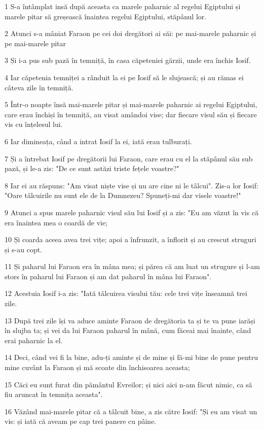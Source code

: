 \par 1 S-a întâmplat insă după aceasta ca marele paharnic al regelui Egiptului și marele pitar să greșească înaintea regelui Egiptului, stăpânul lor.
\par 2 Atunci s-a mâniat Faraon pe cei doi dregători ai săi: pe mai-marele paharnic și pe mai-marele pitar
\par 3 Și i-a pus sub pază în temniță, în casa căpeteniei gărzii, unde era închis Iosif.
\par 4 Iar căpetenia temniței a rânduit la ei pe Iosif să le slujească; și au rămas ei câteva zile în temniță.
\par 5 Într-o noapte însă mai-marele pitar și mai-marele paharnic ai regelui Egiptului, care erau închiși în temniță, au visat amândoi vise; dar fiecare visul său și fiecare vis cu înțelesul lui.
\par 6 Iar dimineața, când a intrat Iosif la ei, iată erau tulburați.
\par 7 Și a întrebat Iosif pe dregătorii lui Faraon, care erau cu el la stăpânul său sub pază, și le-a zis: "De ce sunt astăzi triste fețele voastre?"
\par 8 Iar ei au răspuns: "Am visat niște vise și nu are cine ni le tâlcui". Zis-a lor Iosif: "Oare tâlcuirile nu sunt ele de la Dumnezeu? Spuneți-mi dar visele voastre!"
\par 9 Atunci a spus marele paharnic visul său lui Iosif și a zis: "Eu am văzut în vis că era înaintea mea o coardă de vie;
\par 10 Și coarda aceea avea trei vițe; apoi a înfrunzit, a înflorit și au crescut struguri și s-au copt.
\par 11 Și paharul lui Faraon era în mâna mea; și părea că am luat un strugure și l-am stors în paharul lui Faraon și am dat paharul în mâna lui Faraon".
\par 12 Acestuia Iosif i-a zis: "Iată tâlcuirea visului tău: cele trei vițe înseamnă trei zile.
\par 13 După trei zile își va aduce aminte Faraon de dregătoria ta și te va pune iarăși în slujba ta; și vei da lui Faraon paharul în mână, cum făceai mai înainte, când erai paharnic la el.
\par 14 Deci, când vei fi la bine, adu-ți aminte și de mine și fă-mi bine de pune pentru mine cuvânt la Faraon și mă scoate din închisoarea aceasta;
\par 15 Căci eu sunt furat din pământul Evreilor; și nici aici n-am făcut nimic, ca să fiu aruncat în temnița aceasta".
\par 16 Văzând mai-marele pitar că a tâlcuit bine, a zis către Iosif: "Și eu am visat un vis: și iată că aveam pe cap trei panere cu pâine.
